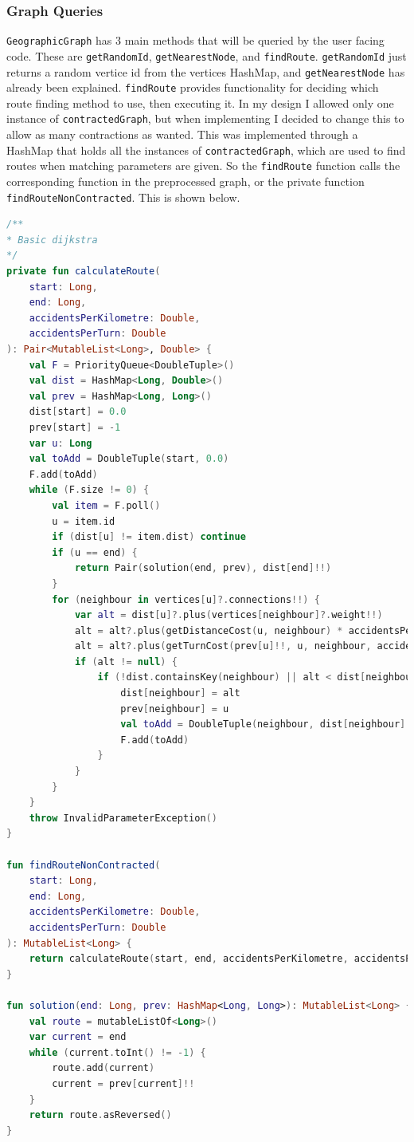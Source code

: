 \documentclass[11pt,twoside,a4paper]{report}
\begin{document}
\subsubsection{Graph Queries}
\texttt{GeographicGraph} has 3 main methods that will be queried by the user facing code. These are \texttt{getRandomId}, \texttt{getNearestNode}, and \texttt{findRoute}. \texttt{getRandomId} just returns a random vertice id from the vertices HashMap, and \texttt{getNearestNode} has already been explained.
\texttt{findRoute} provides functionality for deciding which route finding method to use, then executing it. In my design I allowed only one instance of \texttt{contractedGraph}, but when implementing I decided to change this to allow as many contractions as wanted. This was implemented through a HashMap that holds all the instances of \texttt{contractedGraph}, which are used to find routes when matching parameters are given. 
So the \texttt{findRoute} function calls the corresponding function in the preprocessed graph, or the private function \texttt{findRouteNonContracted}. This is shown below.
\begin{lstlisting}[language=kotlin]
/**
* Basic dijkstra
*/
private fun calculateRoute(
    start: Long,
    end: Long,
    accidentsPerKilometre: Double,
    accidentsPerTurn: Double
): Pair<MutableList<Long>, Double> {
    val F = PriorityQueue<DoubleTuple>()
    val dist = HashMap<Long, Double>()
    val prev = HashMap<Long, Long>()
    dist[start] = 0.0
    prev[start] = -1
    var u: Long
    val toAdd = DoubleTuple(start, 0.0)
    F.add(toAdd)
    while (F.size != 0) {
        val item = F.poll()
        u = item.id
        if (dist[u] != item.dist) continue
        if (u == end) {
            return Pair(solution(end, prev), dist[end]!!)
        }
        for (neighbour in vertices[u]?.connections!!) {
            var alt = dist[u]?.plus(vertices[neighbour]?.weight!!)
            alt = alt?.plus(getDistanceCost(u, neighbour) * accidentsPerKilometre)
            alt = alt?.plus(getTurnCost(prev[u]!!, u, neighbour, accidentsPerTurn))
            if (alt != null) {
                if (!dist.containsKey(neighbour) || alt < dist[neighbour]!!) {
                    dist[neighbour] = alt
                    prev[neighbour] = u
                    val toAdd = DoubleTuple(neighbour, dist[neighbour]!!)
                    F.add(toAdd)
                }
            }
        }
    }
    throw InvalidParameterException()
}

fun findRouteNonContracted(
    start: Long,
    end: Long,
    accidentsPerKilometre: Double,
    accidentsPerTurn: Double
): MutableList<Long> {
    return calculateRoute(start, end, accidentsPerKilometre, accidentsPerTurn).first
}

fun solution(end: Long, prev: HashMap<Long, Long>): MutableList<Long> {
    val route = mutableListOf<Long>()
    var current = end
    while (current.toInt() != -1) {
        route.add(current)
        current = prev[current]!!
    }
    return route.asReversed()
}
\end{lstlisting}
\end{document}
